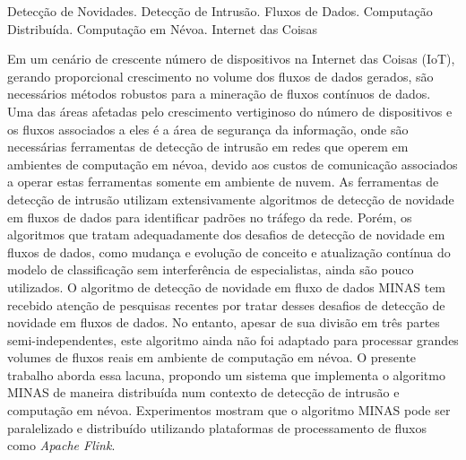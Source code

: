 
\begin{resumo}{Detecção de Novidades. Detecção de Intrusão. Fluxos de Dados.
    Computação Distribuída. Computação em Névoa. Internet das Coisas}
 
    Em um cenário de crescente número de dispositivos na Internet das Coisas
    (IoT), gerando proporcional crescimento no volume dos fluxos de dados
    gerados, são necessários métodos robustos para a mineração de fluxos
    contínuos de dados.
    Uma das áreas afetadas pelo crescimento vertiginoso do número de dispositivos
    e os fluxos associados a eles é a área de segurança da informação, onde são
    necessárias ferramentas de detecção de intrusão em redes que operem em
    ambientes de computação em névoa, devido aos custos de comunicação associados
    a operar estas ferramentas somente em ambiente de nuvem.
    As ferramentas de detecção de intrusão utilizam extensivamente algoritmos de
    detecção de novidade em fluxos de dados para identificar padrões no tráfego
    da rede.
    Porém, os algoritmos que tratam adequadamente dos desafios de detecção de
    novidade em fluxos de dados, como mudança e evolução de conceito e
    atualização contínua do modelo de classificação sem interferência de
    especialistas, ainda são pouco utilizados.
    O algoritmo de detecção de novidade em fluxo de dados MINAS tem recebido
    atenção de pesquisas recentes por tratar desses desafios de detecção de
    novidade em fluxos de dados.
    No entanto, apesar de sua divisão em três partes semi-independentes, este
    algoritmo ainda não foi adaptado para processar grandes volumes de fluxos
    reais em ambiente de computação em névoa.
    O presente trabalho aborda essa lacuna, propondo um sistema
    que implementa o algoritmo MINAS de maneira distribuída num contexto
    de detecção de intrusão e computação em névoa.
    Experimentos mostram que o algoritmo MINAS pode ser paralelizado e
    distribuído utilizando plataformas de processamento de fluxos como
    \emph{Apache Flink}.
 \end{resumo}
 
